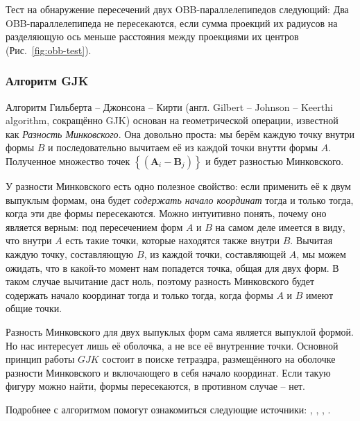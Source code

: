 Тест на обнаружение пересечений двух OBB-параллелепипедов следующий: Два
OBB-параллелепипеда не пересекаются, если сумма проекций их радиусов на
разделяющую ось меньше расстояния между проекциями их центров
(Рис.~\ref{fig:obb-test}).

\subsubsection{Алгоритм GJK}

Алгоритм Гильберта -- Джонсона -- Кирти (англ. Gilbert -- Johnson -- Keerthi
algorithm, сокращённо GJK) основан на геометрической операции, известной как
\textit{Разность Минковского}. Она довольно проста: мы берём каждую точку
внутри формы $B$ и последовательно вычитаем её из каждой точки внутти формы
$A$. Полученное множество точек $\left\{\left( \mathbf{A}_i - \mathbf{B}_j
\right)\right\}$ и будет разностью Минковского. \cite[с.~829]{gea}

У разности Минковского есть одно полезное свойство: если применить её к двум
выпуклым формам, она будет \textit{содержать начало координат} тогда и только
тогда, когда эти две формы пересекаются. Можно интуитивно понять, почему оно
является верным: под пересечением форм $A$ и $B$ на самом деле имеется в виду,
что внутри $A$ есть такие точки, которые находятся также внутри $B$. Вычитая
каждую точку, составляющую $B$, из каждой точки, составляющей $A$, мы можем
ожидать, что в какой-то момент нам попадется точка, общая для двух форм. В
таком случае вычитание даст ноль, поэтому разность Минковского будет содержать
начало координат тогда и только тогда, когда формы $A$ и $B$ имеют общие точки.

Разность Минковского для двух выпуклых форм сама является выпуклой формой. Но
нас интересует лишь её оболочка, а не все её внутренние точки. Основной принцип
работы $GJK$ состоит в поиске тетраэдра, размещённого на оболочке разности
Минковского и включающего в себя начало координат. Если такую фигуру можно
найти, формы пересекаются, в противном случае -- нет. \cite[с.~830]{gea}

Подробнее с алгоритмом помогут ознакомиться следующие источники: \cite{gjksm},
\cite{gjkppt1}, \cite{gjkppt2}, \cite{gjk}.
